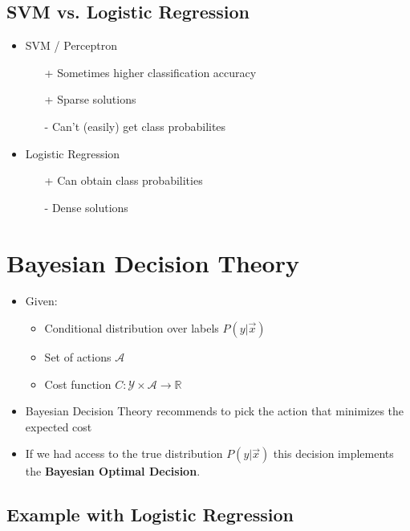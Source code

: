 \documentclass[10pt,a4paper]{scrartcl}
\newcommand{\Argmin}[2]{\text{arg}\underset{#1}{\min}\left(#2\right)}
\begin{document}
\begin{multicols*}{2}
\begin{itemize}
\end{itemize}

\subsection{SVM vs. Logistic Regression}

\begin{itemize}
\item SVM / Perceptron
\begin{itemize}
\item[+] Sometimes higher classification accuracy
\item[+] Sparse solutions
\item[-] Can't (easily) get class probabilites
\end{itemize}
\item Logistic Regression
\begin{itemize}
\item[+] Can obtain class probabilities
\item[-] Dense solutions
\end{itemize}
\end{itemize}

\section{Bayesian Decision Theory}

\begin{itemize}
\item Given:
\begin{itemize}
\item Conditional distribution over labels $P(y|\vec{x})$
\item Set of actions $\mathcal{A}$
\item Cost function $C:\mathcal{Y}\times\mathcal{A}\rightarrow\mathbb{R}$
\end{itemize}
\item Bayesian Decision Theory recommends to pick the action that minimizes the expected cost

\mportant{$a^\ast=\Argmin{a\in\mathcal{A}}{\mathbb{E}_y\left[C(y,a)|\vec{x}\right]}$}
\item If we had access to the true distribution $P(y|\vec{x})$ this decision implements the \textbf{Bayesian Optimal Decision}.
\end{itemize}

\subsection{Example with Logistic Regression}


\end{multicols*}
\end{document}
